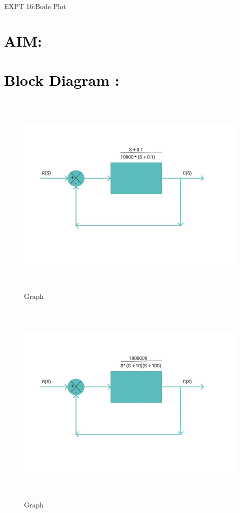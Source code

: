 \documentclass[12pt]{article}
\begin{document}
 
 
\begin{center}
    \LARGE {EXPT 16:Bode Plot}
             
\end{center}

\section*{\textcolor{black}{AIM: }}

\section*{\textcolor{black}{Block Diagram :}}

\begin{figure}[!hth]
        \centering
        \includegraphics[width =20cm, height = 10cm]{images/bode block 1.jpeg}
        \caption{Graph}
        \label{Graph}
\end{figure}
\begin{figure}[!hth]
        \centering
        \includegraphics[width =20cm, height = 10cm]{images/bode block 2.jpeg}
        \caption{Graph}
        \label{Graph}
\end{figure}
\end{document}

